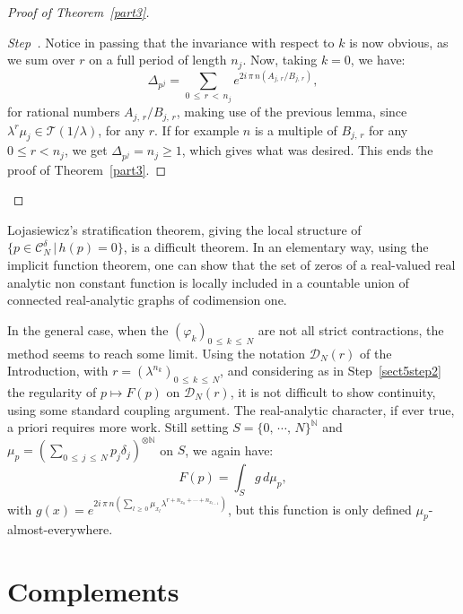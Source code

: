 \documentclass[AHL,Unicode,longabstracts,published]{cedram}
\newcommand{\Nbb}{\mathbb N}
\newcommand{\Ccl}{\mathcal{C}}
\newcommand{\Dcl}{\mathcal{D}}
\newcommand{\Tcl}{\mathcal{T}}
\newcounter{stepcount}
\newenvironment{step}{\refstepcounter{stepcount}\begin{proof}[Step~\thestepcount]}{\let\qed\relax\end{proof}}
\begin{document}
\begin{proof}[{Proof of Theorem~\ref{part3}}]
\begin{step}
Notice in passing that the invariance with respect to $k$ is now obvious, as we sum over $r$ on a full period of length $n_j$. Now, taking $k=0$, we have:
\[
\Delta_{p^j}=\sum_{0\,\leq\,r\,<\,n_j}e^{2i\,\pi\, n(A_{j,\,r}/B_{j,\,r})},
\]
for rational numbers $A_{j,\,r}/B_{j,\,r}$, making use of the previous lemma, since $\lambda^r\mu_j\in{\Tcl}(1/\lambda)$, for any $r$. If for example $n$ is a multiple of $B_{j,\,r}$ for any $0\leq r<n_j$, we get $\Delta_{p^j}=n_j\geq1$, which gives what was desired. This ends the proof of Theorem~\ref{part3}.\qedhere
\end{step}\let\qed\relax
\end{proof}


\begin{rema}
Lojasiewicz's stratification theorem, giving the local structure of $\{p\in{\Ccl}^{\delta}_N\,|\,h(p)=0\}$, is a difficult theorem. In an elementary way, using the implicit function theorem, one can show that the set of zeros of a real-valued real analytic non constant function is locally included in a countable union of connected real-analytic graphs of codimension one.
\end{rema}

\begin{rema}
In the general case, when the $(\varphi_k)_{0\,\leq\, k\,\leq\,N}$ are not all strict contractions, the method seems to reach some limit. Using the notation ${\Dcl}_N(r)$ of the Introduction, with $r=(\lambda^{n_k})_{0\,\leq\,k\,\leq\,N}$, and considering as in Step~\ref{sect5step2} the regularity of $p\longmapsto F(p)$ on ${\Dcl}_N(r)$, it is not difficult to show continuity, using some standard coupling argument. The real-analytic character, if ever true, a priori requires more work. Still setting $S=\{0,\,\cdots,\,N\}^{\Nbb}$ and $\mu_p=(\sum_{0\,\leq\,j\,\leq\,N}p_j\delta_j)^{\otimes\Nbb}$ on $S$, we again have:
\[
F(p)=\int_{S}g\,d\mu_p,
\]
with $g(x)=e^{2i\,\pi\,n({\sum_{l\,\geq\,0}\mu_{x_l}\lambda^{r+n_{x_0}+\cdots+n_{x_{l-1}}}})}$, but this function is only defined $\mu_p$-almost-everywhere.
\end{rema}



\section{Complements}
\end{document}
